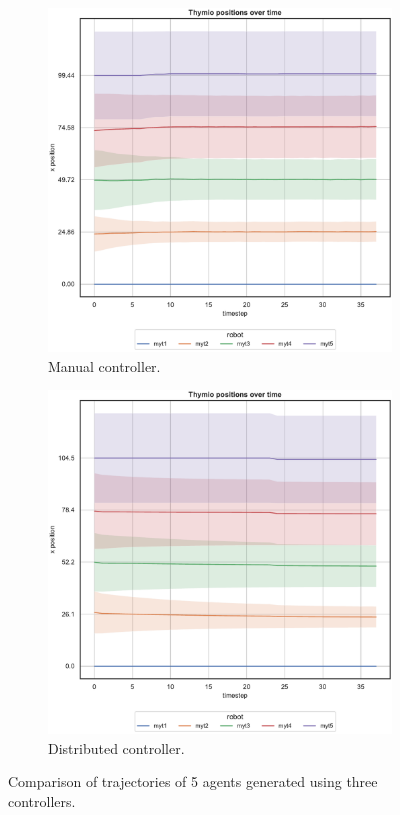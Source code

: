 \begin{figure}[!htb]
\begin{center}
\begin{subfigure}[h]{0.325\textwidth}
			\includegraphics[width=\textwidth]{contents/images/net-d18/N5/position-overtime-manual}%
			\caption{Manual controller.}
		\end{subfigure}
		\hfill
		\begin{subfigure}[h]{0.325\textwidth}
			\centering
			\includegraphics[width=\textwidth]{contents/images/net-d18/N5/position-overtime-distributed}
			\caption{Distributed controller.}
		\end{subfigure}
	\end{center}
	\caption[Evaluation of the trajectories learned by \texttt{net-d18} using 5 
	agents.]{Comparison of trajectories of 5 agents generated using three 
		controllers.}
	\label{fig:net-d18traj5}
\end{figure}
